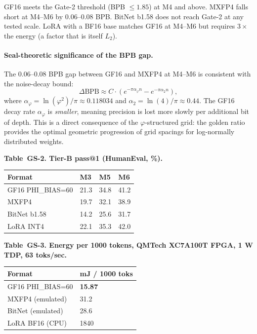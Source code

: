 GF16 meets the Gate-2 threshold (BPB $\leq 1.85$) at M4 and
above.  MXFP4 falls short at M4--M6 by 0.06--0.08 BPB.
BitNet b1.58 does not reach Gate-2 at any tested scale.
LoRA with a BF16 base matches GF16 at M4--M6 but requires
$3\times$ the energy (a factor that is itself $L_2$).

\paragraph{Seal-theoretic significance of the BPB gap.}
The 0.06--0.08 BPB gap between GF16 and MXFP4 at M4--M6 is
consistent with the noise-decay bound:
\[
  \Delta\text{BPB} \approx C \cdot (e^{-\pi\alpha_\varphi n} - e^{-\pi\alpha_2 n}),
\]
where $\alpha_\varphi = \ln(\varphi^2)/\pi \approx 0.118034$
and $\alpha_2 = \ln(4)/\pi \approx 0.44$.  The GF16 decay
rate $\alpha_\varphi$ is \emph{smaller}, meaning precision is
lost more slowly per additional bit of depth.  This is a
direct consequence of the $\varphi$-structured grid: the
golden ratio provides the optimal geometric progression of
grid spacings for log-normally distributed weights.

\textbf{Table~GS-2. Tier-B pass@1 (HumanEval, \%).}

\begin{longtable}[]{@{}llll@{}}
\toprule\noalign{}
Format & M3 & M5 & M6 \\
\midrule\noalign{}
\endhead
\bottomrule\noalign{}
\endlastfoot
GF16 PHI\_BIAS=60 & 21.3 & 34.8 & 41.2 \\
MXFP4             & 19.7 & 32.1 & 38.9 \\
BitNet b1.58      & 14.2 & 25.6 & 31.7 \\
LoRA INT4         & 22.1 & 35.3 & 42.0 \\
\end{longtable}

\textbf{Table~GS-3. Energy per 1000 tokens, QMTech XC7A100T FPGA, 1 W TDP, 63 toks/sec.}

\begin{longtable}[]{@{}ll@{}}
\toprule\noalign{}
Format & mJ / 1000 toks \\
\midrule\noalign{}
\endhead
\bottomrule\noalign{}
\endlastfoot
GF16 PHI\_BIAS=60  & \textbf{15.87} \\
MXFP4 (emulated)  & 31.2 \\
BitNet (emulated) & 28.6 \\
LoRA BF16 (CPU)   & 1840 \\
\end{longtable}

